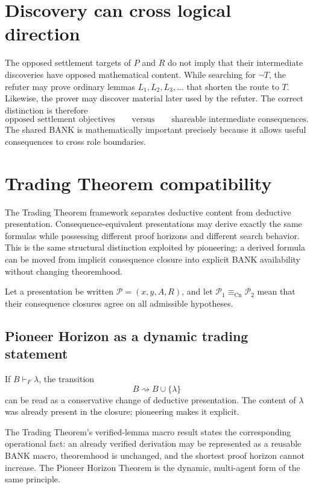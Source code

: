 \documentclass[11pt]{article}
\theoremstyle{remark}
\newcommand{\CnEq}{\equiv_{\mathrm{Cn}}}
\begin{document}
\section{Discovery can cross logical direction}
The opposed settlement targets of $P$ and $R$ do not imply that their intermediate discoveries have opposed mathematical content. While searching for $\neg T$, the refuter may prove ordinary lemmas $L_1,L_2,L_3,\ldots$ that shorten the route to $T$. Likewise, the prover may discover material later used by the refuter. The correct distinction is therefore
\[
\text{opposed settlement objectives}\qquad\text{versus}\qquad\text{shareable intermediate consequences}.
\]
The shared BANK is mathematically important precisely because it allows useful consequences to cross role boundaries.

\section{Trading Theorem compatibility}
The Trading Theorem framework separates deductive content from deductive presentation. Consequence-equivalent presentations may derive exactly the same formulas while possessing different proof horizons and different search behavior. This is the same structural distinction exploited by pioneering: a derived formula can be moved from implicit consequence closure into explicit BANK availability without changing theoremhood.

Let a presentation be written $\mathcal P=(x,y,A,R)$, and let $\mathcal P_1\CnEq\mathcal P_2$ mean that their consequence closures agree on all admissible hypotheses.

\subsection{Pioneer Horizon as a dynamic trading statement}
If $B\vdash_F\lambda$, the transition
\[
B\rightsquigarrow B\cup\{\lambda\}
\]
can be read as a conservative change of deductive presentation. The content of $\lambda$ was already present in the closure; pioneering makes it explicit.

The Trading Theorem's verified-lemma macro result states the corresponding operational fact: an already verified derivation may be represented as a reusable BANK macro, theoremhood is unchanged, and the shortest proof horizon cannot increase. The Pioneer Horizon Theorem is the dynamic, multi-agent form of the same principle.
\end{document}

